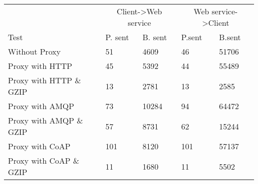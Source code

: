 \begin{tabularx}{\textwidth}{lXXXX}
\hline
\multicolumn{1}{l}{}                  & \multicolumn{2}{c}{Client->Web service}                           & \multicolumn{2}{c}{Web service->Client}                           \\
\multicolumn{1}{l}{Test} & \multicolumn{1}{l}{P. sent} & \multicolumn{1}{l}{B. sent} & \multicolumn{1}{l}{P.sent} & \multicolumn{1}{l}{B.sent} \\ \hline
Without Proxy                   & 51             & 4609           & 46             & 51706          \\
Proxy with HTTP                 & 45             & 5392           & 44             & 55489          \\
Proxy with HTTP \& GZIP         & 13             & 2781           & 13             & 2585           \\
Proxy with AMQP                 & 73             & 10284          & 94             & 64472          \\
Proxy with AMQP \& GZIP         & 57             & 8731           & 62             & 15244          \\
Proxy with CoAP                 & 101            & 8120           & 101            & 57137          \\
Proxy with CoAP \& GZIP         & 11             & 1680           & 11             & 5502           \\
\end{tabularx}
